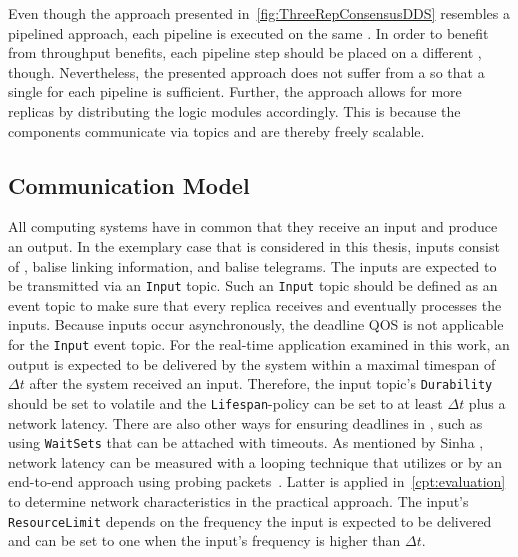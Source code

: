 \noindent
Even though the approach presented in~\autoref{fig:ThreeRepConsensusDDS} resembles a pipelined approach, each pipeline is executed on the same .
In order to benefit from throughput benefits, each pipeline step should be placed on a different , though.
Nevertheless, the presented approach does not suffer from a \ChallengeThrough so that a single  for each pipeline is sufficient.
Further, the approach allows for more replicas by distributing the logic modules accordingly.
This is because the components communicate via  topics and are thereby freely scalable.

\subsection{Communication Model}
All computing systems have in common that they receive an input and produce an output.
In the exemplary case that is considered in this thesis, inputs consist of , balise linking information, and balise telegrams.
The inputs are expected to be transmitted via an \texttt{Input}  topic.
Such an \texttt{Input} topic should be defined as an event topic to make sure that every replica receives and eventually processes the inputs.
Because inputs occur asynchronously, the deadline \gls*{QOS} is not applicable for the \texttt{Input} event topic.
For the real-time application examined in this work, an output is expected to be delivered by the system within a maximal timespan of $\Delta t$ after the system received an input.
Therefore, the input topic's \texttt{Durability} should be set to volatile and the \texttt{Lifespan}-policy can be set to at least $\Delta t$ plus a network latency.
There are also other ways for ensuring deadlines in , such as using \texttt{WaitSets} that can be attached with timeouts.
As mentioned by Sinha \etal, network latency can be measured with a looping technique that utilizes   or by an end-to-end approach using probing packets~\cite{SinhaMeasureNetworkLatency}.
Latter is applied in~\autoref{cpt:evaluation} to determine network characteristics in the practical approach.
The input's \texttt{ResourceLimit} depends on the frequency the input is expected to be delivered and can be set to one when the input's frequency is higher than $\Delta t$.
\\

